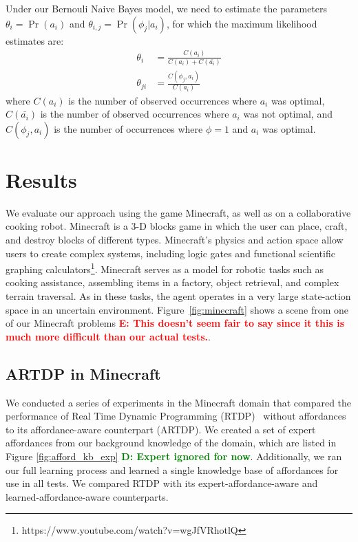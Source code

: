\documentclass[conference]{IEEEtran}
\newcommand{\dnote}[1]{\textcolor{Green}{\textbf{D: #1}}}
\newcommand{\enote}[1]{\textcolor{Red}{\textbf{E: #1}}}
\begin{document}
Under our Bernouli Naive Bayes model, we need to estimate the parameters
$\theta_i = \Pr(a_i)$ and $\theta_{i,j} = \Pr(\phi_j | a_i)$, for which the maximum likelihood estimates are:
\begin{align}
\theta_i &= \frac{C(a_i)}{C(a_i) + C(\bar{a_i})} \\
\theta_{ji} &= \frac{C(\phi_j, a_i)}{C(a_i)}
\end{align}
where $C(a_i)$ is the number of observed occurrences where $a_i$ was optimal,
$C(\bar{a_i})$ is the number of observed occurrences where $a_i$ was not optimal,
and $C(\phi_j, a_i)$ is the number of occurrences where $\phi=1$ and $a_i$ was optimal.

\section{Results}
\label{sec:results}

We evaluate our approach using the game Minecraft, as well as on a
collaborative cooking robot.  Minecraft is a 3-D blocks game in which
the user can place, craft, and destroy blocks of different types.
Minecraft's physics and action space allow users to create complex
systems, including logic gates and functional scientific graphing
calculators\footnote{https://www.youtube.com/watch?v=wgJfVRhotlQ}.
Minecraft serves as a model for robotic tasks such as cooking
assistance, assembling items in a factory, object retrieval, and
complex terrain traversal.  As in these tasks, the agent operates in a
very large state-action space in an uncertain environment.
Figure~\ref{fig:minecraft} shows a scene from one of our Minecraft
problems \enote{This doesn't seem fair to say since it this is much more difficult than our actual tests.}.

\subsection{ARTDP in Minecraft}
We conducted a series of experiments in the Minecraft domain that
compared the performance of Real Time Dynamic Programming (RTDP)~\citep{barto95}
without affordances to its affordance-aware counterpart (ARTDP). We created a set of expert
affordances from our background knowledge of the domain, which are
listed in Figure \ref{fig:afford_kb_exp} \dnote{Expert ignored for now}. Additionally, we ran our full
learning process and learned a single knowledge base of affordances for use in all tests. We compared
RTDP with its expert-affordance-aware and learned-affordance-aware 
counterparts. 
\end{document}
